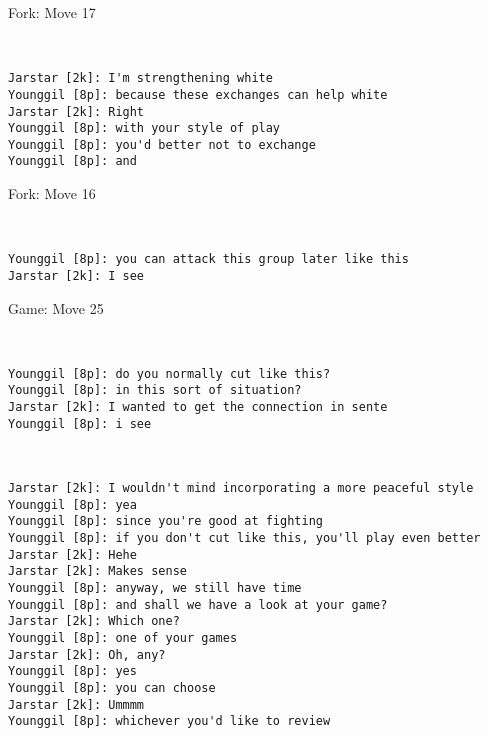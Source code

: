 \documentclass{article}
\begin{document}
\begin{subsection}{Fork: Move 17}
\begin{center}
\cleargoban
{}
\largegoban
\showfullgoban
\\\begin{lstlisting}
Jarstar [2k]: I'm strengthening white
Younggil [8p]: because these exchanges can help white
Jarstar [2k]: Right
Younggil [8p]: with your style of play
Younggil [8p]: you'd better not to exchange
Younggil [8p]: and
\end{lstlisting}
\end{center}
\end{subsection}
\begin{subsection}{Fork: Move 16}
\begin{center}
\cleargoban
{}
\showfullgoban
\\\begin{lstlisting}
Younggil [8p]: you can attack this group later like this
Jarstar [2k]: I see
\end{lstlisting}
\end{center}
\end{subsection}
\newpage
\begin{section}{Game: Move 25}
\begin{center}
\cleargoban
{}
\showfullgoban
\\\begin{lstlisting}
Younggil [8p]: do you normally cut like this?
Younggil [8p]: in this sort of situation?
Jarstar [2k]: I wanted to get the connection in sente
Younggil [8p]: i see
\end{lstlisting}
\end{center}
\begin{center}
\cleargoban
{}
\showfullgoban
\\\begin{lstlisting}
Jarstar [2k]: I wouldn't mind incorporating a more peaceful style
Younggil [8p]: yea
Younggil [8p]: since you're good at fighting
Younggil [8p]: if you don't cut like this, you'll play even better
Jarstar [2k]: Hehe
Jarstar [2k]: Makes sense
Younggil [8p]: anyway, we still have time
Younggil [8p]: and shall we have a look at your game?
Jarstar [2k]: Which one?
Younggil [8p]: one of your games
Jarstar [2k]: Oh, any?
Younggil [8p]: yes
Younggil [8p]: you can choose
Jarstar [2k]: Ummmm
Younggil [8p]: whichever you'd like to review
\end{lstlisting}
\end{center}
\end{section}
\end{document}

